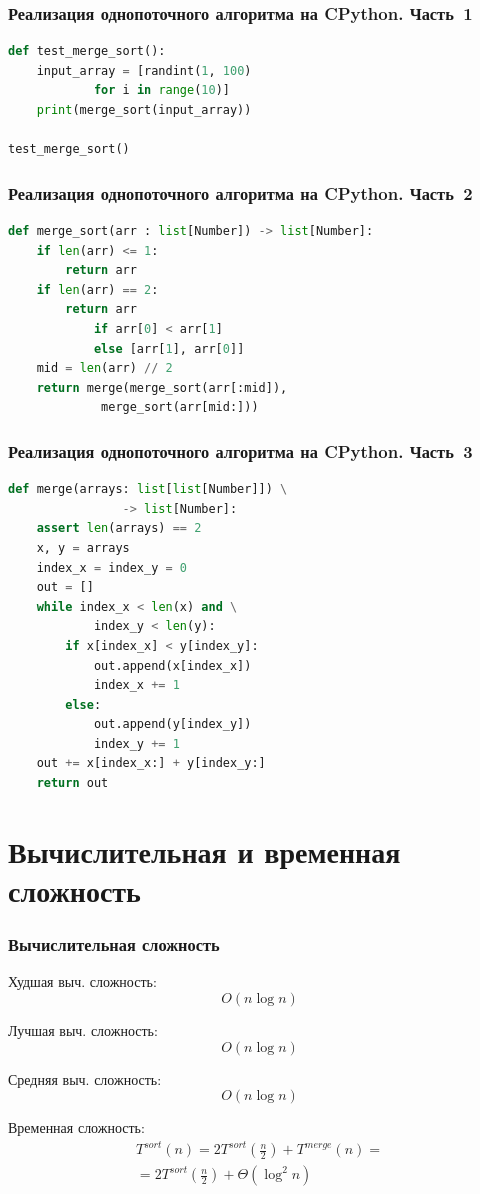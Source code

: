 \documentclass{beamer}
\begin{document}
	\begin{frame}[fragile]
		\frametitle{Реализация однопоточного алгоритма на CPython. Часть~1}
		\begin{lstlisting}[language=Python]		
def test_merge_sort():
	input_array = [randint(1, 100) 
			for i in range(10)]
	print(merge_sort(input_array))

test_merge_sort()
		\end{lstlisting}
	
	\end{frame}

	\begin{frame}[fragile]
		\frametitle{Реализация однопоточного алгоритма на CPython. Часть~2}
		\begin{lstlisting}[language=Python]		
def merge_sort(arr : list[Number]) -> list[Number]:
	if len(arr) <= 1:
		return arr
	if len(arr) == 2:
		return arr 
			if arr[0] < arr[1] 
			else [arr[1], arr[0]]
	mid = len(arr) // 2
	return merge(merge_sort(arr[:mid]), 
		     merge_sort(arr[mid:]))
		\end{lstlisting}
	
	\end{frame}

	\begin{frame}[fragile]
		\frametitle{Реализация однопоточного алгоритма на CPython. Часть~3}
		\begin{lstlisting}[language=Python]		
def merge(arrays: list[list[Number]]) \
				-> list[Number]:
	assert len(arrays) == 2
	x, y = arrays
	index_x = index_y = 0
	out = []
	while index_x < len(x) and \
			index_y < len(y):
		if x[index_x] < y[index_y]:
			out.append(x[index_x])
			index_x += 1
		else:
			out.append(y[index_y])
			index_y += 1
	out += x[index_x:] + y[index_y:]
	return out
		\end{lstlisting}
	
	\end{frame}


	\section{Вычислительная и временная сложность}
	\begin{frame}
		\frametitle{Вычислительная сложность}
		
		Худшая выч. сложность:
		\begin{equation}
			O(n\log{}{n})
		\end{equation}
		
		Лучшая выч. сложность:
		\begin{equation}
			O(n\log{}{n})
		\end{equation}
		
		Средняя выч. сложность:
		\begin{equation}
			O(n\log{}{n})
		\end{equation}
	
		Временная сложность:
		\begin{multline}
			T^{sort}(n)=2T^{sort}\left(\frac{n}{2}\right)+T^{merge}(n)=\\=2T^{sort}\left(\frac{n}{2}\right)+\Theta(\log^2{}{n})
		\end{multline}
	\end{frame}
	
\end{document}
